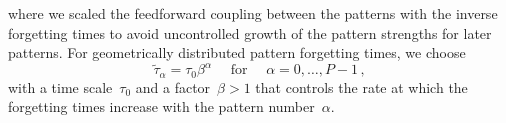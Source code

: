 %
%
where we scaled the feedforward coupling between the patterns with the inverse forgetting times to avoid uncontrolled growth of the pattern strengths for later patterns. For geometrically distributed pattern forgetting times, we choose
\begin{equation}
\tilde{\tau}_\alpha = \tau_0 \beta^{\alpha} \quad \text{ for } \quad \alpha = 0,\ldots,P-1 \,, \label{eq:geometric_forgetting}
\end{equation}
with a time scale~$\tau_0$ and a factor~$\beta>1$ that controls the rate at which the forgetting times increase with the pattern number~$\alpha$. 
%

